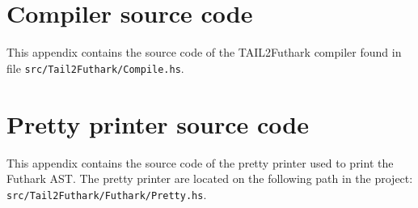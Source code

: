 \documentclass[11pt]{article}
\begin{document}
\lstset{breaklines=true}



\newpage

\section{Compiler source code}
\label{app:impl}

This appendix contains the source code of the TAIL2Futhark compiler found in file {\tt src/Tail2Futhark/Compile.hs}. 


\newpage

\section{Pretty printer source code}
\label{app:pretty}

This appendix contains the source code of the pretty printer used to print the Futhark AST. The pretty printer are located on the following path in the project: {\tt src/Tail2Futhark/Futhark/Pretty.hs}. 



\newpage
\end{document}
